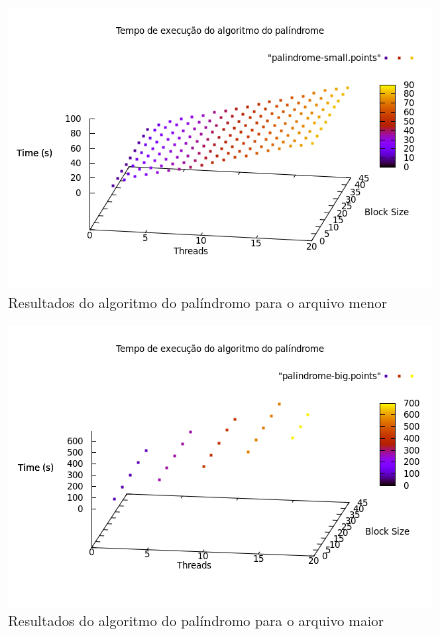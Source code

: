 \documentclass[a4paper]{article}
\begin{document}
\begin{figure}[float=p]
	\includegraphics[scale=0.5]{graph-palindrome-small}
	\caption{Resultados do algoritmo do palíndromo para o arquivo menor}
	\label{graph-palindrome-small}
\end{figure}
\begin{figure}[float=p]
	\includegraphics[scale=0.5]{graph-palindrome-big}
	\caption{Resultados do algoritmo do palíndromo para o arquivo maior}
	\label{graph-palindrome-big}
\end{figure}
\end{document}
